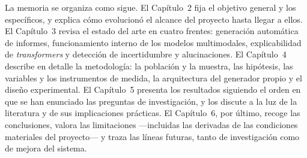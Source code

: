 La memoria se organiza como sigue. El Capítulo~2 fija el objetivo general y los específicos, y
explica cómo evolucionó el alcance del proyecto hasta llegar a ellos. El Capítulo~3 revisa el estado
del arte en cuatro frentes: generación automática de informes, funcionamiento interno de los modelos
multimodales, explicabilidad de \textit{transformers} y detección de incertidumbre y alucinaciones. El
Capítulo~4 describe en detalle la metodología: la población y la muestra, las hipótesis, las variables
y los instrumentos de medida, la arquitectura del generador propio y el diseño experimental. El
Capítulo~5 presenta los resultados siguiendo el orden en que se han enunciado las preguntas de
investigación, y los discute a la luz de la literatura y de sus implicaciones prácticas. El
Capítulo~6, por último, recoge las conclusiones, valora las limitaciones —incluidas las derivadas de
las condiciones materiales del proyecto— y traza las líneas futuras, tanto de investigación como de
mejora del sistema.
